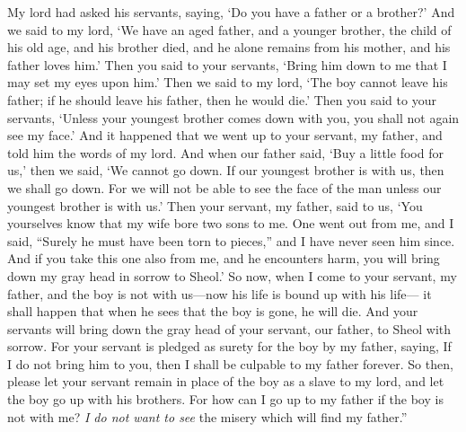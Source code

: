 \begin{biblechapter}
\verse My lord had asked his servants, saying, ‘Do you have a father or a brother?’
\verse And we said to my lord, ‘We have an aged father, and a younger brother, the child of his old age, and his brother died, and he alone remains from his mother, and his father loves him.’
\verse Then you said to your servants, ‘Bring him down to me that I may set my eyes upon him.’
\verse Then we said to my lord, ‘The boy cannot leave his father; if he should leave his father, then he would die.’
\verse Then you said to your servants, ‘Unless your youngest brother comes down with you, you shall not again see my face.’
\verse And it happened that we went up to your servant, my father, and told him the words of my lord.
\verse And when our father said, ‘Buy a little food for us,’
\verse then we said, ‘We cannot go down. If our youngest brother is with us, then we shall go down. For we will not be able to see the face of the man unless our youngest brother is with us.’
\verse Then your servant, my father, said to us, ‘You yourselves know that my wife bore two sons to me.
\verse One went out from me, and I said, “Surely he must have been torn to pieces,” and I have never seen him since.
\verse And if you take this one also from me, and he encounters harm, you will bring down my gray head in sorrow to Sheol.’
\verse So now, when I come to your servant, my father, and the boy is not with us—now his life is bound up with his life—
\verse it shall happen that when he sees that the boy is gone, he will die. And your servants will bring down the gray head of your servant, our father, to Sheol with sorrow.
\verse For your servant is pledged as surety for the boy by my father, saying, If I do not bring him to you, then I shall be culpable to my father forever.
\verse So then, please let your servant remain in place of the boy as a slave to my lord, and let the boy go up with his brothers.
\verse For how can I go up to my father if the boy is not with me? \textit{I do not want to see} the misery which will find my father.”
\end{biblechapter}

